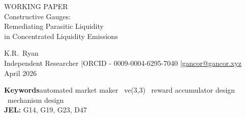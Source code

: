 \documentclass[11pt,a4paper]{article}
\theoremstyle{definition}
\theoremstyle{plain}
\theoremstyle{remark}
\begin{document}
\sloppy
\thispagestyle{plain}

\begin{center}
{\fontsize{10pt}{12pt}\selectfont WORKING PAPER}\\[6pt]
{\huge Constructive Gauges:\\[6pt]
Remediating Parasitic Liquidity\\[4pt]
in Concentrated Liquidity Emissions}

\vspace{14pt}
{\large K.R.\ Ryan}\\[4pt]
{\fontsize{9pt}{11pt}\selectfont Independent Researcher \quad|\quad ORCID - 0009-0004-6295-7040 \quad|\quad \href{mailto:gancor@gancor.xyz}{gancor@gancor.xyz}}\\[4pt]
{\fontsize{9pt}{11pt}\selectfont April 2026}

\vspace{12pt}
{\fontsize{9pt}{11pt}\selectfont
\begin{minipage}{0.82\linewidth}\centering
\textbf{Keywords}\hspace{0.6em}automated market maker \textperiodcentered\ ve(3,3) \textperiodcentered\ reward accumulator design \textperiodcentered\ mechanism design\\[4pt]
\textbf{JEL:} G14, G19, G23, D47
\end{minipage}}
\end{center}

\vspace{-1pt}
\centerline{\scalebox{1.5}{$\therefore$}}
\vspace{14pt}
\end{document}
